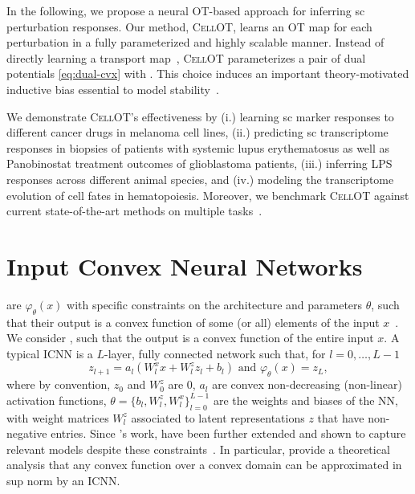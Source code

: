  In the following, we propose a neural \acrlong{OT}-based approach for inferring \acrlong{sc} perturbation responses. 
Our method, \textsc{CellOT}, learns an \acrlong{OT} map for each perturbation in a fully parameterized and highly scalable manner. Instead of directly learning a transport map~\citep{korotin2021wasserstein, yang2018scalable, prasad2020optimal}, \textsc{CellOT} parameterizes a pair of dual potentials \eqref{eq:dual-cvx} with  \citep{amos2017input}. This choice induces an important theory-motivated inductive bias essential to model stability~\citep{makkuva2020optimal}. 

 We demonstrate \textsc{CellOT}'s effectiveness by (i.) learning \acrlong{sc} marker responses to different cancer drugs in melanoma cell lines, (ii.) predicting \acrlong{sc} transcriptome responses in biopsies of patients with systemic lupus erythematosus as well as Panobinostat treatment outcomes of glioblastoma patients, (iii.) inferring \acrfull{LPS} responses across different animal species, and (iv.) modeling the transcriptome evolution of cell fates in hematopoiesis. Moreover, we benchmark \textsc{CellOT} against current state-of-the-art methods on multiple tasks~\citep{lopez2018scvi, lotfollahi2019scgen, chen2020dissecting}.


\section{Input Convex Neural Networks}
\label{sec:icnns}

 are  $\varphi_\theta(x)$ with specific constraints on the architecture and parameters $\theta$, such that their output is a convex function of some (or all) elements of the input $x$~\citep{amos2017input}. We consider  , such that the output is a convex function of the entire input $x$. A typical \acrshort{ICNN} is a $L$-layer, fully connected network such that, for $l = 0, \dots, L-1$
\begin{equation} \label{eq:icnn}
    z_{l+1} = a_l(W^x_lx + W^z_l z_l + b_l)  \text{ and } \varphi_\theta(x) = z_L,
\end{equation}
where by convention, $z_0$ and $W^z_0$ are $0$, $a_l$ are convex non-decreasing (non-linear) activation functions, $\theta=\{b_l, W^z_l, W^x_l\}_{l=0}^{L-1}$ are the weights and biases of the \acrlong{NN}, with weight matrices $W^z_l$ associated to latent representations $z$ that have non-negative entries. Since \citet{amos2017input}'s work,  have been further extended and shown to capture relevant models despite these constraints~\citep{amos2017input, makkuva2020optimal, huang2021convex}. In particular, \citet{chen2018optimal} provide a theoretical analysis that any convex function over a convex domain can be approximated in sup norm by an \acrshort{ICNN}.


